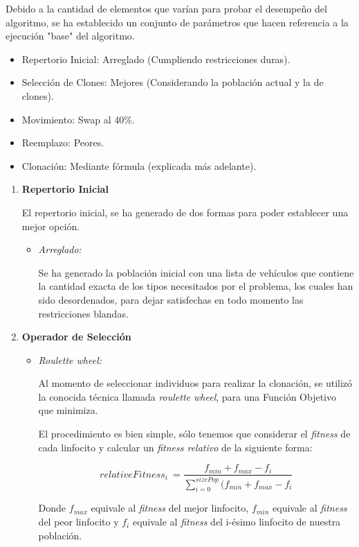 Debido a la cantidad de elementos que varían para probar el desempeño
del algoritmo, se ha establecido un conjunto de parámetros que hacen
referencia a la ejecución "base" del algoritmo.
\begin{itemize}
	\item Repertorio Inicial: Arreglado (Cumpliendo restricciones duras).
	\item Selección de Clones: Mejores (Considerando la población actual y la de clones).
	\item Movimiento: Swap al 40\%.
	\item Reemplazo: Peores.
	\item Clonación: Mediante fórmula (explicada más adelante).
\end{itemize}

\begin{enumerate}
	\item \textbf{Repertorio Inicial}

		El repertorio inicial, se ha generado de dos formas para poder establecer una mejor opción.
		\begin{itemize}
			\item \emph{Arreglado:} 
				
				Se ha generado la población inicial con una lista de vehículos que contiene
				la cantidad exacta de los tipos necesitados por el problema, los cuales
				han sido desordenados, para dejar satisfechas en todo momento las restricciones
				blandas.
		\end{itemize}

	\item \textbf{Operador de Selección}
		\begin{itemize}
			\item \emph{Roulette wheel:}
 
				Al momento de seleccionar individuos para realizar la clonación, se utilizó la conocida técnica llamada
				\emph{roulette wheel}, para una Función Objetivo que minimiza.
				
				El procedimiento es bien simple, sólo tenemos que considerar el \emph{fitness} de cada linfocito y calcular un
				\emph{fitness relativo} de la siguiente forma:
				
				$$relativeFitness_{i}\ = \frac{f_{min} + f_{max} - f_{i}}{\sum\limits_{i=0}^{sizePop} (f_{min} + f_{max} - f_{i}}$$
				
				Donde $f_{max}$ equivale al \emph{fitness} del mejor linfocito,
				$f_{min}$ equivale al \emph{fitness} del peor linfocito y
				$f_{i}$ equivale al \emph{fitness} del i-ésimo linfocito de nuestra población.
				

\end{itemize}
\end{enumerate}
